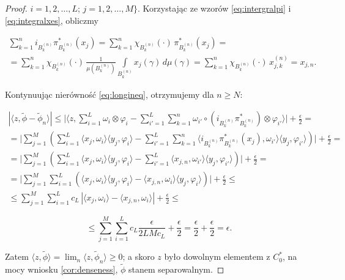 \begin{proof}
$i = 1,2, \ldots, L$; $j = 1,2, \ldots, M \}$.
Korzystając ze wzorów \eqref{eq:intergralpi} i \eqref{eq:integralxes},
obliczmy
\begin{linenomath*}
 \begin{multline}
\sum \limits_{k=1}^{n} i_{B_{k}^{(n)}} \pi^{*}_{B_{k}^{(n)}} (x_{j})
=\sum \limits_{k=1}^{n} \chi_{B_{k}^{(n)}}(\cdot) \,
\pi^{*}_{B_{k}^{(n)}} (x_{j}) = \\
=\sum \limits_{k=1}^{n} \chi_{B_{k}^{(n)}}(\cdot) \,
\frac{1}{\mu(B_{k}^{(n)})}
\int \limits_{B_{k}^{(n)}} x_{j}(\gamma) \, d\mu(\gamma)
=\sum \limits_{k=1}^{n} \chi_{B_{k}^{(n)}}(\cdot) \,
x_{j,k}^{(n)}=x_{j,n}.
 \end{multline}
\end{linenomath*}
Kontynuując nierówność \eqref{eq:longineq}, otrzymujemy dla $n \geq N$:
\begin{linenomath*}
 \begin{multline}
   \nonumber
|\langle z, \tilde{\phi} - \tilde{\phi}_{n} \rangle|\leq \Big |\langle z,
\sum \limits_{i=1}^{L} \omega_{i} \otimes \varphi_{i} -\sum \limits_{i'=1}^{L}
\sum \limits_{k=1}^{n}\omega_{i'} \circ (i_{B_{k}^{(n)}} \pi^{*}_{B_{k}^{(n)}})
\otimes \varphi_{i'}\rangle \Big | + \frac{\epsilon}{2} =\\
= \Big |  \sum \limits_{j=1}^{M}\left( \sum \limits_{i =1}^{L}
\langle x_{j}, \omega_{i} \rangle \langle y_{j}, \varphi_{i} \rangle -
\sum \limits_{i'=1}^{L} \sum \limits_{k=1}^{n}
\langle i_{B_{k}^{(n)}} \pi^{*}_{B_{k}^{(n)}} (x_{j}) ,
\omega_{i'} \rangle \langle y_{j}, \varphi_{i'} \rangle
\right) \Big |  + \frac{\epsilon}{2} =\\
= \Big | \sum \limits_{j=1}^{M}\left( \sum \limits_{i=1}^{L}
\langle x_{j}, \omega_{i} \rangle \langle y_{j}, \varphi_{i} \rangle  -
\sum \limits_{i'=1}^{L}\langle x_{j,n} , \omega_{i'} \rangle \langle y_{j}, \varphi_{i'} \rangle
\right) \Big |  + \frac{\epsilon}{2} =\\
= \Big | \sum \limits_{j=1}^{M} \sum \limits_{i=1}^{L}
\left(\langle x_{j}, \omega_{i} \rangle \langle y_{j}, \varphi_{i} \rangle  -
\langle x_{j,n} , \omega_{i} \rangle \langle y_{j}, \varphi_{i} \rangle
\right) \Big |  + \frac{\epsilon}{2} \leq\\
\leq \sum \limits_{j=1}^{M} \sum \limits_{i=1}^{L}
c_{L}  \, \left | \langle    x_{j}, \omega_{i} \rangle -
\langle x_{j,n} , \omega_{i} \rangle\right | + \frac{\epsilon}{2} \leq
\end{multline}
\end{linenomath*}
\begin{linenomath*}
\begin{equation}
\leq \sum \limits_{j=1}^{M} \sum \limits_{i=1}^{L}
c_{L}  \frac{\epsilon}{2 L M c_{L}}     + \frac{\epsilon}{2}
=  \frac{\epsilon}{2} +  \frac{\epsilon}{2} =  \epsilon.
 \end{equation}
\end{linenomath*}
Zatem  $\langle z , \tilde{\phi} \rangle  =
\lim_{n} \langle z , \tilde{\phi}_{n} \rangle \geq 0$;
a skoro $z$ było dowolnym elementem z $C_{0}^{*}$,
na mocy wniosku \ref{cor:denseness}, $\tilde{\phi}$ stanem separowalnym.
\end{proof}

